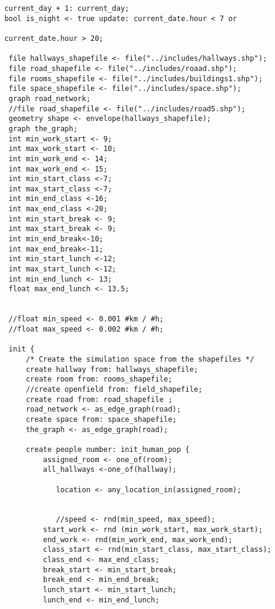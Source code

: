 \begin{lstlisting}
       current_day + 1: current_day;
       bool is_night <- true update: current_date.hour < 7 or 
       
       current_date.hour > 20;
        
        file hallways_shapefile <- file("../includes/hallways.shp");
        file road_shapefile <- file("../includes/roaad.shp");	
        file rooms_shapefile <- file("../includes/buildings1.shp");
        file space_shapefile <- file("../includes/space.shp");	
        graph road_network;	
        //file road_shapefile <- file("../includes/road5.shp");		
        geometry shape <- envelope(hallways_shapefile);	
        graph the_graph;        
        int min_work_start <- 9;
        int max_work_start <- 10;
        int min_work_end <- 14; 
        int max_work_end <- 15; 
        int min_start_class <-7;
        int max_start_class <-7;
        int min_end_class <-16;
        int max_end_class <-20;
        int min_start_break <- 9;
        int max_start_break <- 9;
        int min_end_break<-10;
        int max_end_break<-11;
        int min_start_lunch <-12;
        int max_start_lunch <-12;
        int min_end_lunch <- 13;
        float max_end_lunch <- 13.5;
    
        
        //float min_speed <- 0.001 #km / #h;
        //float max_speed <- 0.002 #km / #h;
        
        init {
            /* Create the simulation space from the shapefiles */
            create hallway from: hallways_shapefile;
            create room from: rooms_shapefile;
            //create openfield from: field_shapefile;
            create road from: road_shapefile ;
            road_network <- as_edge_graph(road);
            create space from: space_shapefile;
            the_graph <- as_edge_graph(road);
    
            create people number: init_human_pop {
                assigned_room <- one_of(room);
                all_hallways <-one_of(hallway);
                
                   location <- any_location_in(assigned_room);
                   
                   
                   //speed <- rnd(min_speed, max_speed);
                start_work <- rnd (min_work_start, max_work_start);
                end_work <- rnd(min_work_end, max_work_end);
                class_start <- rnd(min_start_class, max_start_class);
                class_end <- max_end_class;
                break_start <- min_start_break;
                break_end <- min_end_break;
                lunch_start <- min_start_lunch;
                lunch_end <- min_end_lunch;
                

\end{lstlisting}
